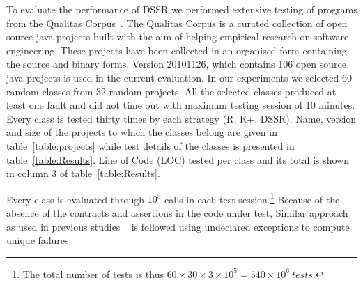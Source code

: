 To evaluate the performance of DSSR we performed extensive testing of programs from the Qualitas Corpus~\cite{Tempero2010a}. The Qualitas Corpus is a curated collection of open source java projects built with the aim of helping empirical research on  software engineering. These projects have been collected in an organised form containing the source and binary forms. Version 20101126, which contains 106 open source java projects is used in the current evaluation. In our experiments we selected 60 random classes from 32 random projects. All the selected classes produced at least one fault and did not time out with maximum testing session of 10 minutes. Every class is tested thirty times by each strategy (R, R+, DSSR). Name, version and size of the projects to which the classes belong are given in table~\ref{table:projects} while test details of the classes is presented in table~\ref{table:Results}. Line of Code (LOC) tested per class and its total is shown in column 3 of table~\ref{table:Results}. 

Every class is evaluated through $10^5$ calls in each test session.\footnote{The total number of tests is thus $60\times 30\times 3 \times 10^5 = 540\times 10^6~tests$.} 
Because of the absence of the contracts and assertions in the code under test, Similar approach as used in previous studies ~\cite{Oriol2012} is followed using undeclared exceptions to compute unique failures.


